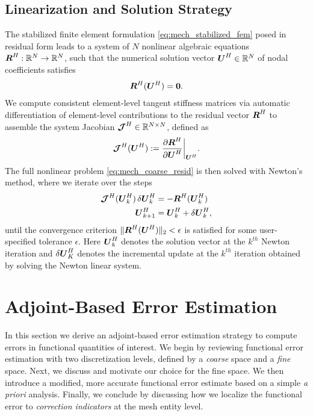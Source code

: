 \subsection{Linearization and Solution Strategy}

The stabilized finite element formulation \eqref{eq:mech_stabilized_fem}
posed in residual form leads to a system of $N$ nonlinear algebraic equations
$\boldsymbol{R}^H : \mathbb{R}^N \to \mathbb{R}^N$, such that the numerical solution
vector $\boldsymbol{U}^H \in \mathbb{R}^N$ of nodal coefficients satisfies
%
\begin{gather}
\boldsymbol{R}^H(\boldsymbol{U}^H) = \boldsymbol{0}.
\label{eq:mech_coarse_resid}
\end{gather}
%
We compute consistent element-level tangent stiffness matrices via automatic
differentiation \cite{chen2014automatic} of element-level contributions to the
residual vector $\boldsymbol{R}^H$ to assemble the system Jacobian
$\boldsymbol{\mathcal{J}}^H \in \mathbb{R}^{N \times N}$, defined as
%
\begin{gather}
\boldsymbol{\mathcal{J}}^H(\boldsymbol{U}^H) :=
\frac{ \partial \boldsymbol{R}^H } { \partial \boldsymbol{U}^H } \biggr|_{\boldsymbol{U}^H}.
\label{eq:mech_jacobian}
\end{gather}
%
The full nonlinear problem \eqref{eq:mech_coarse_resid} is then solved with
Newton's method, where we iterate over the steps
%
\begin{gather}
\begin{aligned}
\boldsymbol{\mathcal{J}}^H ( \boldsymbol{U}^H_k ) \, \delta \boldsymbol{U}^H_k &=
- \boldsymbol{R}^H( \boldsymbol{U}^H_k ) \\
\boldsymbol{U}^H_{k+1} &= \boldsymbol{U}^H_k + \delta \boldsymbol{U}^H_k,
\end{aligned}
\label{eq:mech_newtons}
\end{gather}
%
until the convergence criterion $\| \boldsymbol{R}^H(\boldsymbol{U}^H) \|_2 < \epsilon$
is satisfied for some user-specified tolerance $\epsilon$. Here
$\boldsymbol{U}^H_k$ denotes the solution vector at the $k^{th}$ Newton iteration
and $\delta \boldsymbol{U}^H_K$ denotes the incremental update at the $k^{th}$
iteration obtained by solving the Newton linear system.

\section{Adjoint-Based Error Estimation}

In this section we derive an adjoint-based error estimation strategy to
compute errors in functional quantities of interest. We begin by reviewing
functional error estimation with two discretization levels, defined by a
\emph{coarse} space and a \emph{fine} space. Next, we discuss and motivate
our choice for the fine space. We then introduce a modified, more accurate
functional error estimate based on a simple \emph{a priori} analysis.
Finally, we conclude by discussing how we localize the functional error
to \emph{correction indicators} at the mesh entity level.

